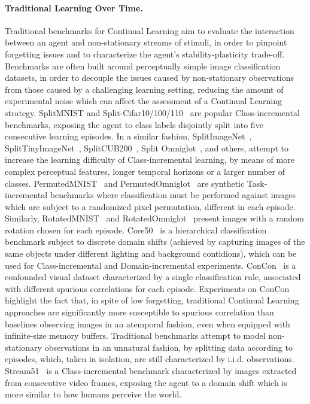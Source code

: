\paragraph{Traditional Learning Over Time.}
Traditional benchmarks for Continual Learning aim to evaluate the interaction between an agent and non-stationary streams of stimuli, in order to pinpoint forgetting issues and to characterize the agent's stability-plasticity trade-off. Benchmarks are often built around perceptually simple image classification datasets, in order to decouple the issues caused by non-stationary observations from those caused by a challenging learning setting, reducing the amount of experimental noise which can affect the assessment of a Continual Learning strategy.
SplitMNIST and Split-Cifar10/100/110~\cite{zenke2017continual,maltoni2019continuous} are popular Class-incremental benchmarks, exposing the agent to class labels disjointly split into five consecutive learning episodes. In a similar fashion, SplitImageNet~\cite{rebuffi2017icarl}, SplitTinyImageNet~\cite{de2021continual}, SplitCUB200~\cite{lomonaco2021avalanche}, Split Omniglot~\cite{schwarz2018progress}, and others, attempt to increase the learning difficulty of Class-incremental learning, by means of more complex perceptual features, longer temporal horizons or a larger number of classes.
PermutedMNIST~\cite{zenke2017continual} and PermutedOmniglot~\cite{schwarz2018progress} are synthetic Task-incremental benchmarks where classification must be performed against images which are subject to a randomized pixel permutation,  different in each episode. Similarly, RotatedMNIST~\cite{lomonaco2021avalanche} and RotatedOmniglot~\cite{lomonaco2021avalanche} present images with a random rotation chosen for each episode.
Core50~\cite{lomonaco2017core50} is a hierarchical classification benchmark subject to discrete domain shifts (achieved by capturing images of the same objects under different lighting and background contidions), which can be used for Class-incremental and Domain-incremental experiments.
ConCon~\cite{busch2024truth} is a confounded visual dataset characterized by a single classification rule, associated with different spurious correlations for each episode. Experiments on ConCon highlight the fact that, in spite of low forgetting, traditional Continual Learning approaches are significantly more susceptible to spurious correlation than baselines observing images in an atemporal fashion, even when equipped with infinite-size memory buffers.
%
Traditional benchmarks attempt to model non-stationary observations in an unnatural fashion, by splitting data according to episodes, which, taken in isolation, are still characterized by i.i.d. observations. Stream51~\cite{roady2020stream} is a Class-incremental benchmark characterized by images extracted from consecutive video frames, exposing the agent to a domain shift which is more similar to how humans perceive the world.
